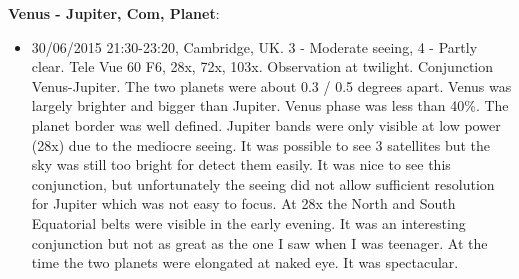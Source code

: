 {\bf Venus - Jupiter, Com, Planet}:
\begin{itemize}
\item 30/06/2015 21:30-23:20, Cambridge, UK. 3 - Moderate seeing, 4 - Partly clear. Tele Vue 60 F6, 28x, 72x, 103x. Observation at twilight. Conjunction Venus-Jupiter. The two planets were about 0.3 / 0.5 degrees apart. Venus was largely brighter and bigger than Jupiter. Venus phase was less than 40\%. The planet border was well defined. Jupiter bands were only visible at low power (28x) due to the mediocre seeing. It was possible to see 3 satellites but the sky was still too bright for detect them easily. It was nice to see this conjunction, but unfortunately the seeing did not allow sufficient resolution for Jupiter which was not easy to focus. At 28x the North and South Equatorial belts were visible in the early evening. It was an interesting conjunction but not as great as the one I saw when I was teenager. At the time the two planets were elongated at naked eye. It was spectacular.
\end{itemize}
